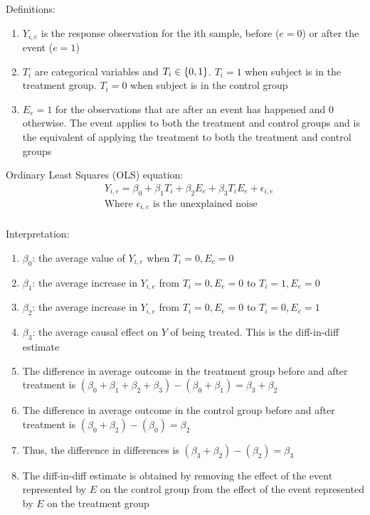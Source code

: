 Definitions:
\begin {enumerate}
\item $Y_{i, e}$ is the response observation for the ith sample, before ($e = 0$) or after the event ($e = 1$)
\item $T_i$ are categorical variables and $T_i \in \{{0, 1}\}$. $T_i = 1$ when subject is in the treatment group.  $T_i = 0$ when subject is in the control group
\item $E_e = 1$ for the observations that are after an event has happened and $0$ otherwise. The event applies to both the treatment and control groups and is the equivalent of applying the treatment to both the treatment and control groups
\end {enumerate}

Ordinary Least Squares (OLS) equation:
\begin {equation} \begin {split} 
& Y_{i, e} = \beta_0 + \beta_1 T_i + \beta_2 E_e + \beta_3 T_i E_e + \epsilon_{i, e} \\
& \text {Where $\epsilon_{i, e}$ is the unexplained noise} \\
\end {split} \end {equation}

Interpretation:
\begin {enumerate}
\item $\beta_0$: the average value of $Y_{i, e}$ when $T_i = 0, E_e = 0$
\item $\beta_1$: the average increase in $Y_{i, e}$ from $T_i = 0, E_e = 0$ to $T_i = 1, E_e = 0$
\item $\beta_2$: the average increase in $Y_{i, e}$ from $T_i = 0, E_e = 0$ to $T_i = 0, E_e = 1$
\item $\beta_3$: the average causal effect on $Y$ of being treated. This is the diff-in-diff estimate
\item The difference in average outcome in the treatment group before and after treatment is $(\beta_0 + \beta_1 + \beta_2 + \beta_3) - (\beta_0 + \beta_1) = \beta_3 + \beta_2$
\item The difference in average outcome in the control group before and after treatment is $(\beta_0 + \beta_2) - (\beta_0) = \beta_2$
\item Thus, the difference in differences is $(\beta_3 + \beta_2) - (\beta_2) = \beta_3$
\item The diff-in-diff estimate is obtained by removing the effect of the event represented by $E$ on the control group from the effect of the event represented by $E$ on the treatment group
\end {enumerate}

